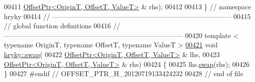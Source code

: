 \begin{DoxyCode}
00411         \hyperlink{classhryky_1_1_offset_ptr}{OffsetPtr<OriginT, OffsetT, ValueT>} & rhs);
00412 
00413 \} \textcolor{comment}{// namespace hryky}
00414 \textcolor{comment}{//
      ------------------------------------------------------------------------------}
00415 \textcolor{comment}{// global function definitions}
00416 \textcolor{comment}{//
      ------------------------------------------------------------------------------}
00420 \textcolor{comment}{}\textcolor{keyword}{template} < \textcolor{keyword}{typename} OriginT, \textcolor{keyword}{typename} OffsetT, \textcolor{keyword}{typename} ValueT >
\hypertarget{offset__ptr_8h_source_l00421}{}\hyperlink{namespacehryky_a5464e322c2478bcff1432a4fe63a8a59}{00421} \textcolor{keywordtype}{void} \hyperlink{namespacehryky_a4282146df5ea2b68cb667896a2205909}{hryky::swap}(
00422     \hyperlink{classhryky_1_1_offset_ptr}{OffsetPtr<OriginT, OffsetT, ValueT>} & lhs,
00423     \hyperlink{classhryky_1_1_offset_ptr}{OffsetPtr<OriginT, OffsetT, ValueT>} & rhs)
00424 \{
00425     lhs.\hyperlink{classhryky_1_1_offset_ptr_ac1e20ff0f8e5ea1511abb6d6ed7745c2}{swap}(rhs);
00426 \}
00427 \textcolor{preprocessor}{#endif // OFFSET\_PTR\_H\_20120719133424232}
00428 \textcolor{preprocessor}{}\textcolor{comment}{// end of file}
\end{DoxyCode}
